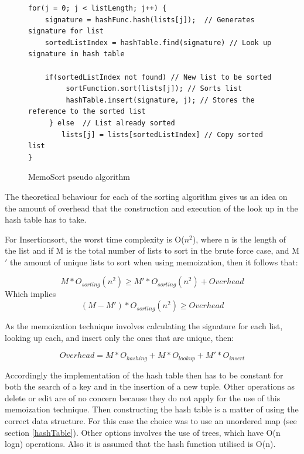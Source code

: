\documentclass[a4paper,12pt]{article}
\begin{document}
\begin{figure}[H]
\begin{small}
\begin{verbatim}
for(j = 0; j < listLength; j++) {
    signature = hashFunc.hash(lists[j]);  // Generates signature for list
    sortedListIndex = hashTable.find(signature) // Look up signature in hash table
    
    if(sortedListIndex not found) // New list to be sorted
         sortFunction.sort(lists[j]); // Sorts list
         hashTable.insert(signature, j); // Stores the reference to the sorted list
     } else  // List already sorted
        lists[j] = lists[sortedListIndex] // Copy sorted list
}
\end{verbatim}
\end{small}
\caption{MemoSort pseudo algorithm}
\label{fig:MemoSortAlgo}
\end{figure}

The theoretical behaviour for each of the sorting algorithm gives us an idea on the amount of overhead that the construction and  execution of the look up in the hash table has to take. 

For Insertionsort, the worst time complexity is O($n^2$), where n is the length of the list and if M is the total number of lists to sort in the brute force case, and M$'$ the amount of unique lists to sort when using memoization, then it follows that:

\begin{equation}
M * O_{sorting}(n^2)  \geq M' * O_{sorting}(n^2)  + Overhead
\end{equation}
Which implies
\begin{equation}
(M - M') *  O_{sorting}(n^2)  \geq Overhead
\end{equation}

As the memoization technique involves calculating the signature for each list, looking up each, and insert only the ones that are unique, then:

\begin{equation}
Overhead =  M * O_{hashing} + M * O_{lookup} + M' * O_{insert}
\end{equation}

Accordingly the implementation of the hash table then has to be constant for both the search of a key and in the insertion of a new tuple. Other operations as delete or edit are of no concern because they do not apply for the use of this memoization technique. Then constructing the hash table is a matter of using the correct data structure. For this case the choice was to use an unordered map (see  section \ref{hashTable}). Other options involves the use of trees, which have O(n logn) operations. Also it is assumed that the hash function utilised is O(n). 
\end{document}

